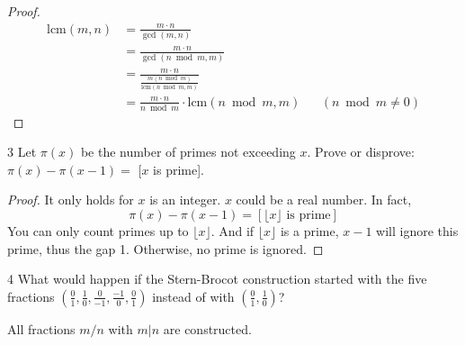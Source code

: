 \documentclass[a4paper,12pt]{article}
\makeatletter
\newtheorem*{solution}{Solution}
\theoremstyle{definition}
\renewenvironment{solution}[1][Solution] {\par\pushQED{\qed}\normalfont\topsep6\p@\@plus6\p@\relax\trivlist\item[\hskip\labelsep\bfseries#1\@addpunct{.}]\ignorespaces}{\popQED\endtrivlist\@endpefalse} \makeatother
\newenvironment{problems}{\begin{list}{}{\renewcommand{\makelabel}[1]{\textbf{##1}\hfil}}}{\end{list}}
\makeatother
\begin{document}
\begin{problems}
\begin{proof}
        \begin{align*}
            \text{lcm}(m,n)&= \frac{m\cdot n}{\gcd (m,n)}\\
            &= \frac{m\cdot n}{\gcd (n \bmod m,m)}\\
            &= \frac{m\cdot n}{\frac{m(n\bmod m)}{\text{lcm}(n\bmod m,m)}}\\
            &=\frac{m\cdot n}{n\bmod m}\cdot\text{lcm}(n\bmod m,m) &&(n\bmod m\neq 0)
        \end{align*}
    \end{proof} 
    \item[3] Let $\pi(x)$ be the number of primes not exceeding $x$.  Prove or disprove: $\pi(x) -\pi(x-1) =$ [$x$ is prime].
    \begin{proof}
        It only holds for $x$ is an integer. $x$ could be a real number. In fact,
        \begin{equation*}
            \pi(x) -\pi(x-1) = [\lfloor x \rfloor\text{ is prime}]
        \end{equation*}
        You can only count primes up to $\lfloor x \rfloor$. And if $\lfloor x\rfloor $ is a prime, $x-1$ will ignore this prime, thus the gap 1. Otherwise, no prime is ignored.
    \end{proof} 
    \item[4] What would happen if the Stern-Brocot construction started with the five fractions $\left(\frac{0}{1},\frac{1}{0},\frac{0}{-1},\frac{-1}{0},\frac{0}{1}\right)$ instead of with $\left(\frac{0}{1},\frac{1}{0}\right)$?
    \begin{solution}
        All fractions $m/n$ with $m\vert n$ are constructed.


\end{solution}
\end{problems}
\end{document}
